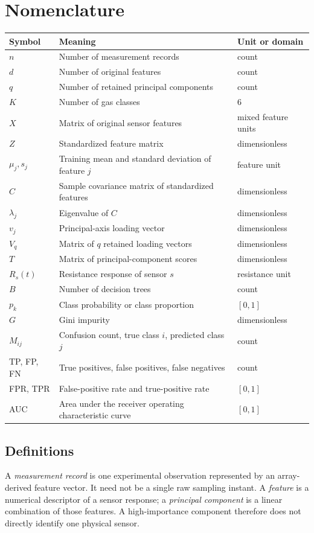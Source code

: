 \documentclass[11pt,a4paper]{article}
\begin{document}
\clearpage\section*{Nomenclature}
\begin{tabularx}{\textwidth}{@{}lXl@{}}\toprule
Symbol & Meaning & Unit or domain\\\midrule
$n$ & Number of measurement records & count\\
$d$ & Number of original features & count\\
$q$ & Number of retained principal components & count\\
$K$ & Number of gas classes & 6\\
$X$ & Matrix of original sensor features & mixed feature units\\
$Z$ & Standardized feature matrix & dimensionless\\
$\mu_j,s_j$ & Training mean and standard deviation of feature $j$ & feature unit\\
$C$ & Sample covariance matrix of standardized features & dimensionless\\
$\lambda_j$ & Eigenvalue of $C$ & dimensionless\\
$v_j$ & Principal-axis loading vector & dimensionless\\
$V_q$ & Matrix of $q$ retained loading vectors & dimensionless\\
$T$ & Matrix of principal-component scores & dimensionless\\
$R_s(t)$ & Resistance response of sensor $s$ & resistance unit\\
$B$ & Number of decision trees & count\\
$p_k$ & Class probability or class proportion & $[0,1]$\\
$G$ & Gini impurity & dimensionless\\
$M_{ij}$ & Confusion count, true class $i$, predicted class $j$ & count\\
TP, FP, FN & True positives, false positives, false negatives & count\\
FPR, TPR & False-positive rate and true-positive rate & $[0,1]$\\
AUC & Area under the receiver operating characteristic curve & $[0,1]$\\\bottomrule
\end{tabularx}

\subsection*{Definitions}
A \emph{measurement record} is one experimental observation represented by an array-derived feature vector. It need not be a single raw sampling instant. A \emph{feature} is a numerical descriptor of a sensor response; a \emph{principal component} is a linear combination of those features. A high-importance component therefore does not directly identify one physical sensor.
\end{document}
